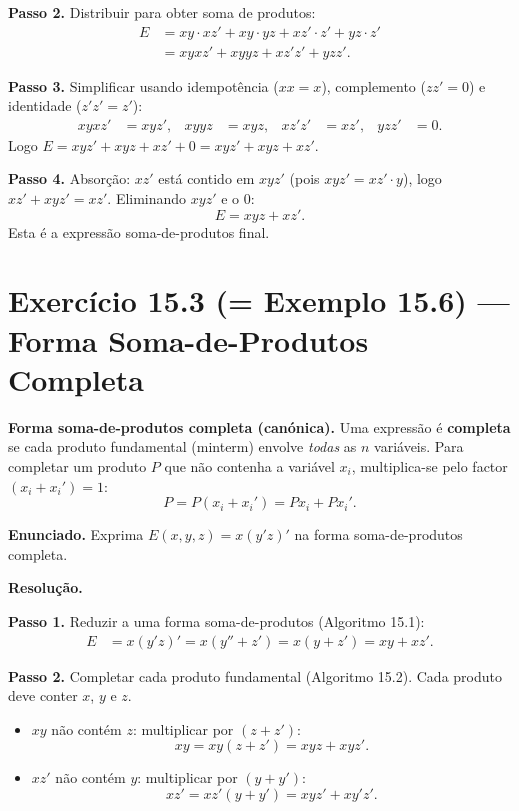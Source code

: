 \documentclass[12pt,a4paper]{article}
\newcommand{\keyword}[1]{\textbf{\textcolor{azul}{#1}}}
\newcommand{\passo}[1]{\medskip\noindent\textcolor{verde}{\textbf{Passo #1.}}\;}
\begin{document}
\passo{2} Distribuir para obter soma de produtos:
\begin{align*}
  E &= xy \cdot xz' + xy \cdot yz + xz' \cdot z' + yz \cdot z'\\
    &= xyxz' + xyyz + xz'z' + yzz'.
\end{align*}

\passo{3} Simplificar usando idempotência ($xx = x$), complemento ($zz' = 0$) e
identidade ($z'z' = z'$):
\begin{align*}
  xyxz' &= xyz', &  xyyz &= xyz, &  xz'z' &= xz', & yzz' &= 0.
\end{align*}
Logo $E = xyz' + xyz + xz' + 0 = xyz' + xyz + xz'$.

\passo{4} Absorção: $xz'$ está contido em $xyz'$ (pois $xyz' = xz' \cdot y$), logo
$xz' + xyz' = xz'$. Eliminando $xyz'$ e o $0$:
\[
  E = xyz + xz'.
\]
Esta é a expressão soma-de-produtos final.

\section*{Exercício 15.3 (= Exemplo 15.6) — Forma Soma-de-Produtos Completa}

\begin{teoriacaixa}
\textbf{Forma soma-de-produtos completa (canónica).} Uma expressão é \keyword{completa}
se cada produto fundamental (minterm) envolve \emph{todas} as $n$ variáveis.
Para completar um produto $P$ que não contenha a variável $x_i$, multiplica-se pelo
factor $(x_i + x_i') = 1$:
\[
  P = P(x_i + x_i') = Px_i + Px_i'.
\]
\end{teoriacaixa}

\textbf{Enunciado.} Exprima $E(x,y,z) = x(y'z)'$ na forma soma-de-produtos completa.

\medskip
\textbf{Resolução.}

\passo{1} Reduzir a uma forma soma-de-produtos (Algoritmo 15.1):
\begin{align*}
  E &= x(y'z)' = x(y'' + z') = x(y + z') = xy + xz'.
\end{align*}

\passo{2} Completar cada produto fundamental (Algoritmo 15.2). Cada produto deve conter
$x$, $y$ e $z$.

\begin{itemize}
  \item $xy$ não contém $z$: multiplicar por $(z + z')$:
        \[
          xy = xy(z + z') = xyz + xyz'.
        \]
  \item $xz'$ não contém $y$: multiplicar por $(y + y')$:
        \[
          xz' = xz'(y + y') = xyz' + xy'z'.
        \]
\end{itemize}
\end{document}
